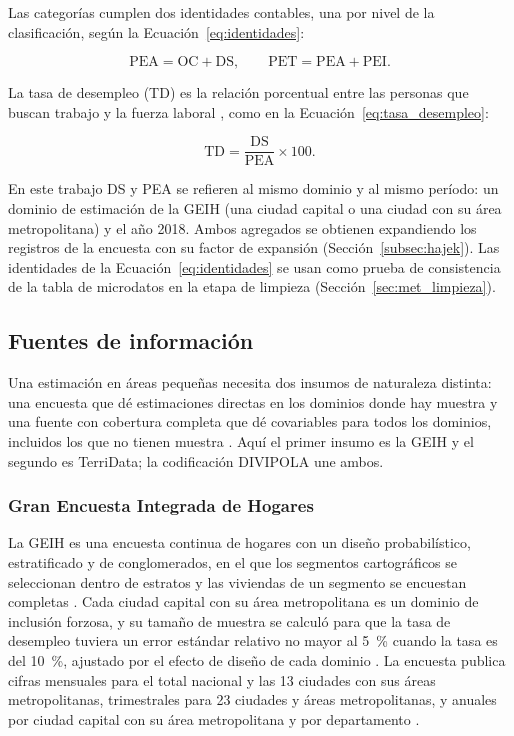 Las categorías cumplen dos identidades contables, una por nivel de la clasificación, según la Ecuación~\ref{eq:identidades}:

\begin{equation}
    \text{PEA} = \text{OC} + \text{DS}, \qquad \text{PET} = \text{PEA} + \text{PEI}.
    \label{eq:identidades}
\end{equation}

La tasa de desempleo (TD) es la relación porcentual entre las personas que buscan trabajo y la fuerza laboral \cite[p.~20]{DANE_GEIH_Metodologia2016}, como en la Ecuación~\ref{eq:tasa_desempleo}:

\begin{equation}
    \text{TD} = \frac{\text{DS}}{\text{PEA}} \times 100 .
    \label{eq:tasa_desempleo}
\end{equation}

En este trabajo DS y PEA se refieren al mismo dominio y al mismo período: un dominio de estimación de la GEIH (una ciudad capital o una ciudad con su área metropolitana) y el año 2018. Ambos agregados se obtienen expandiendo los registros de la encuesta con su factor de expansión (Sección~\ref{subsec:hajek}). Las identidades de la Ecuación~\ref{eq:identidades} se usan como prueba de consistencia de la tabla de microdatos en la etapa de limpieza (Sección~\ref{sec:met_limpieza}).

\subsection{Fuentes de información}

Una estimación en áreas pequeñas necesita dos insumos de naturaleza distinta: una encuesta que dé estimaciones directas en los dominios donde hay muestra y una fuente con cobertura completa que dé covariables para todos los dominios, incluidos los que no tienen muestra \cite[p.~17]{Molina2019}. Aquí el primer insumo es la GEIH y el segundo es TerriData; la codificación DIVIPOLA une ambos.

\subsubsection{Gran Encuesta Integrada de Hogares}

La GEIH es una encuesta continua de hogares con un diseño probabilístico, estratificado y de conglomerados, en el que los segmentos cartográficos se seleccionan dentro de estratos y las viviendas de un segmento se encuestan completas \cite[pp.~11--12]{DANE_GEIH_Metodologia2016}. Cada ciudad capital con su área metropolitana es un dominio de inclusión forzosa, y su tamaño de muestra se calculó para que la tasa de desempleo tuviera un error estándar relativo no mayor al 5~\% cuando la tasa es del 10~\%, ajustado por el efecto de diseño de cada dominio \cite[p.~12]{DANE_GEIH_Metodologia2016}. La encuesta publica cifras mensuales para el total nacional y las 13 ciudades con sus áreas metropolitanas, trimestrales para 23 ciudades y áreas metropolitanas, y anuales por ciudad capital con su área metropolitana y por departamento \cite[pp.~9, 19]{DANE_GEIH_Metodologia2016}.

